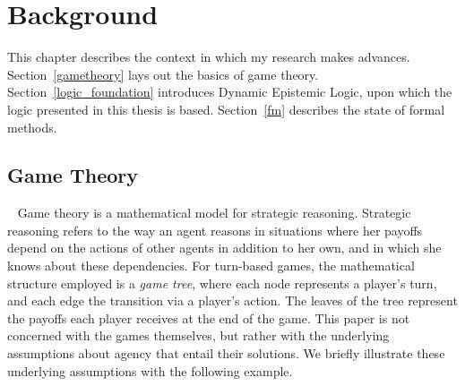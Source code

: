 \chapter{Background}
	\label{CH_02}

This chapter describes the context in which my research makes advances. Section~\ref{gametheory} lays out the basics of game theory. Section~\ref{logic_foundation} introduces Dynamic Epistemic Logic, upon which the logic presented in this thesis is based. Section~\ref{fm} describes the state of formal methods.




\section{Game Theory}~\label{gametheory}
Game theory is a mathematical model for strategic reasoning. Strategic reasoning refers to the way an agent reasons in situations where her payoffs depend on the actions of other agents in addition to her own, and in which she knows about these dependencies. For turn-based games, the mathematical structure employed is a \emph{game tree}, where each node represents a player's turn, and each edge the transition via a player's action. The leaves of the tree represent the payoffs each player receives at the end of the game. This paper is not concerned with the games themselves, but rather with the underlying assumptions about agency that entail their solutions. We briefly illustrate these underlying assumptions with the following example.

